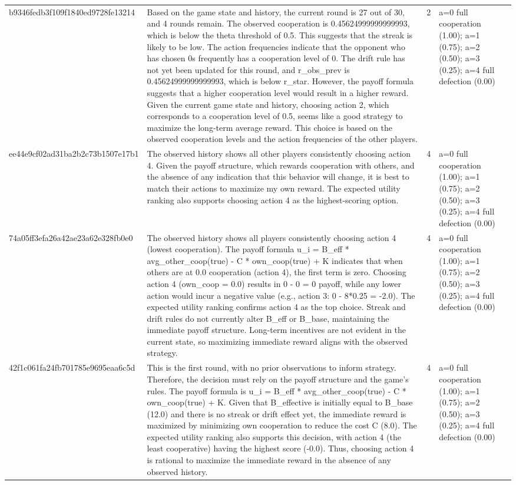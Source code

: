 \begin{tabular}{lp{8cm}ll l}
b9346fedb3f109f1840ed9728fe13214 & Based on the game state and history, the current round is 27 out of 30, and 4 rounds remain. The observed cooperation is 0.45624999999999993, which is below the theta threshold of 0.5. This suggests that the streak is likely to be low. The action frequencies indicate that the opponent who has chosen 0s frequently has a cooperation level of 0. The drift rule has not yet been updated for this round, and r\_obs\_prev is 0.45624999999999993, which is below r\_star. However, the payoff formula suggests that a higher cooperation level would result in a higher reward. Given the current game state and history, choosing action 2, which corresponds to a cooperation level of 0.5, seems like a good strategy to maximize the long-term average reward. This choice is based on the observed cooperation levels and the action frequencies of the other players. & 2 & a=0 full cooperation (1.00); a=1 (0.75); a=2 (0.50); a=3 (0.25); a=4 full defection (0.00) &  \\
ee44e9cf02ad31ba2b2c73b1507e17b1 & The observed history shows all other players consistently choosing action 4. Given the payoff structure, which rewards cooperation with others, and the absence of any indication that this behavior will change, it is best to match their actions to maximize my own reward. The expected utility ranking also supports choosing action 4 as the highest-scoring option. & 4 & a=0 full cooperation (1.00); a=1 (0.75); a=2 (0.50); a=3 (0.25); a=4 full defection (0.00) &  \\
74a05ff3efa26a42ae23a62e328fb0e0 & The observed history shows all players consistently choosing action 4 (lowest cooperation). The payoff formula u\_i = B\_eff * avg\_other\_coop(true) - C * own\_coop(true) + K indicates that when others are at 0.0 cooperation (action 4), the first term is zero. Choosing action 4 (own\_coop = 0.0) results in 0 - 0 = 0 payoff, while any lower action would incur a negative value (e.g., action 3: 0 - 8*0.25 = -2.0). The expected utility ranking confirms action 4 as the top choice. Streak and drift rules do not currently alter B\_eff or B\_base, maintaining the immediate payoff structure. Long-term incentives are not evident in the current state, so maximizing immediate reward aligns with the observed strategy. & 4 & a=0 full cooperation (1.00); a=1 (0.75); a=2 (0.50); a=3 (0.25); a=4 full defection (0.00) &  \\
42f1c061fa24fb701785e9695eaa6c5d & This is the first round, with no prior observations to inform strategy. Therefore, the decision must rely on the payoff structure and the game's rules. The payoff formula is u\_i = B\_eff * avg\_other\_coop(true) - C * own\_coop(true) + K. Given that B\_effective is initially equal to B\_base (12.0) and there is no streak or drift effect yet, the immediate reward is maximized by minimizing own cooperation to reduce the cost C (8.0). The expected utility ranking also supports this decision, with action 4 (the least cooperative) having the highest score (-0.0). Thus, choosing action 4 is rational to maximize the immediate reward in the absence of any observed history. & 4 & a=0 full cooperation (1.00); a=1 (0.75); a=2 (0.50); a=3 (0.25); a=4 full defection (0.00) &  \\

\end{tabular}
